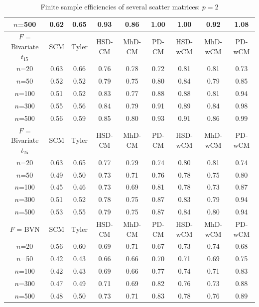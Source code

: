 \begin{table}[b]
\begin{footnotesize}
\begin{tabular}{c|cc|ccc|ccc}
    $n$=500                  & 0.62 & 0.65  & 0.93   & 0.86   & 1.00  & 1.00    & 0.92    & 1.08   \\ \hline
    $F$ = Bivariate $t_{15}$ & SCM  & Tyler & HSD-CM & MhD-CM & PD-CM & HSD-wCM & MhD-wCM & PD-wCM \\ \hline
    $n$=20                   & 0.63 & 0.66  & 0.76   & 0.78   & 0.72  & 0.81    & 0.81    & 0.73   \\
    $n$=50                   & 0.52 & 0.52  & 0.79   & 0.75   & 0.80  & 0.84    & 0.79    & 0.85   \\
    $n$=100                  & 0.51 & 0.52  & 0.83   & 0.77   & 0.88  & 0.88    & 0.81    & 0.94   \\
    $n$=300                  & 0.55 & 0.56  & 0.84   & 0.79   & 0.91  & 0.89    & 0.84    & 0.98   \\
    $n$=500                  & 0.56 & 0.59  & 0.85   & 0.80   & 0.93  & 0.91    & 0.86    & 0.99   \\ \hline
    $F$ = Bivariate $t_{25}$ & SCM  & Tyler & HSD-CM & MhD-CM & PD-CM & HSD-wCM & MhD-wCM & PD-wCM \\ \hline
    $n$=20                   & 0.63 & 0.65  & 0.77   & 0.79   & 0.74  & 0.80    & 0.81    & 0.74   \\
    $n$=50                   & 0.49 & 0.50  & 0.73   & 0.71   & 0.76  & 0.78    & 0.75    & 0.80   \\
    $n$=100                  & 0.45 & 0.46  & 0.73   & 0.69   & 0.81  & 0.78    & 0.73    & 0.87   \\
    $n$=300                  & 0.51 & 0.52  & 0.78   & 0.75   & 0.87  & 0.83    & 0.79    & 0.94   \\
    $n$=500                  & 0.53 & 0.55  & 0.79   & 0.75   & 0.87  & 0.84    & 0.80    & 0.94   \\ \hline
    $F$ = BVN                & SCM  & Tyler & HSD-CM & MhD-CM & PD-CM & HSD-wCM & MhD-wCM & PD-wCM \\ \hline
    $n$=20                   & 0.56 & 0.60  & 0.69   & 0.71   & 0.67  & 0.73    & 0.74    & 0.68   \\
    $n$=50                   & 0.42 & 0.43  & 0.66   & 0.66   & 0.70  & 0.71    & 0.69    & 0.75   \\
    $n$=100                  & 0.42 & 0.43  & 0.69   & 0.66   & 0.77  & 0.74    & 0.71    & 0.83   \\
    $n$=300                  & 0.47 & 0.49  & 0.71   & 0.69   & 0.82  & 0.76    & 0.73    & 0.88   \\
    $n$=500                  & 0.48 & 0.50  & 0.73   & 0.71   & 0.83  & 0.78    & 0.76    & 0.89   \\ \hline
    \end{tabular}
\end{footnotesize}
\caption{Finite sample efficiencies of several scatter matrices: $p=2$}
\label{table:FSEtable2}
\end{table}


